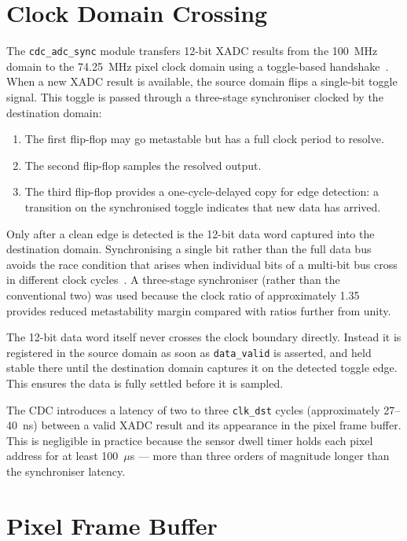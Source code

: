 \section{Clock Domain Crossing}

The \texttt{cdc\_adc\_sync} module transfers 12-bit XADC results from the 100~MHz domain to the 74.25~MHz pixel clock domain using a toggle-based handshake~\cite{cummings2001}. When a new XADC result is available, the source domain flips a single-bit toggle signal. This toggle is passed through a three-stage synchroniser clocked by the destination domain:

\begin{enumerate}
  \item The first flip-flop may go metastable but has a full clock period
    to resolve.
  \item The second flip-flop samples the resolved output.
  \item The third flip-flop provides a one-cycle-delayed copy for edge
    detection: a transition on the synchronised toggle indicates that new
    data has arrived.
\end{enumerate}

Only after a clean edge is detected is the 12-bit data word captured into the destination domain. Synchronising a single bit rather than the full data bus avoids the race condition that arises when individual bits of a multi-bit bus cross in different clock cycles~\cite{cummings2001}. A three-stage synchroniser (rather than the conventional two) was used because the clock ratio of approximately 1.35 provides reduced metastability margin compared with ratios further from unity.

The 12-bit data word itself never crosses the clock boundary directly. Instead it is registered in the source domain as soon as \texttt{data\_valid} is asserted, and held stable there until the destination domain captures it on the detected toggle edge. This ensures the data is fully settled before it is sampled.

The CDC introduces a latency of two to three \texttt{clk\_dst} cycles (approximately 27--40~ns) between a valid XADC result and its appearance in the pixel frame buffer. This is negligible in practice because the sensor dwell timer holds each pixel address for at least 100~$\mu$s --- more than three orders of magnitude longer than the synchroniser latency.

\section{Pixel Frame Buffer}

